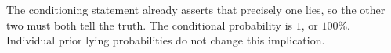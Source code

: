 The conditioning statement already asserts that precisely one lies, so the other two must both tell the truth. The conditional probability is $\boxed1$, or $100\%$. Individual prior lying probabilities do not change this implication.
